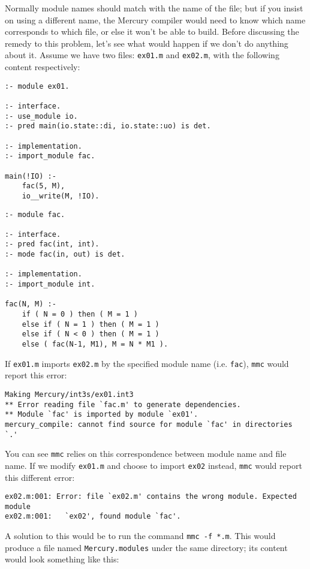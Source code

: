 Normally module names should match with the name of the file; but if you insist on using a different name, the Mercury compiler would need to know which name corresponds to which file, or else it won't be able to build. Before discussing the remedy to this problem, let's see what would happen if we don't do anything about it. Assume we have two files: \texttt{ex01.m} and \texttt{ex02.m}, with the following content respectively:

\begin{lstlisting}[language=Mercury]
% ex01.m
:- module ex01.

:- interface.
:- use_module io.
:- pred main(io.state::di, io.state::uo) is det.

:- implementation.
:- import_module fac.

main(!IO) :-
	fac(5, M),
	io__write(M, !IO).
\end{lstlisting}

\begin{lstlisting}[language=Mercury]
:- module fac.

:- interface.
:- pred fac(int, int).
:- mode fac(in, out) is det.

:- implementation.
:- import_module int.

fac(N, M) :-
	if ( N = 0 ) then ( M = 1 )
	else if ( N = 1 ) then ( M = 1 )
	else if ( N < 0 ) then ( M = 1 )
	else ( fac(N-1, M1), M = N * M1 ).
\end{lstlisting}

If \texttt{ex01.m} imports \texttt{ex02.m} by the specified module name (i.e. \texttt{fac}), \texttt{mmc} would report this error:

\begin{lstlisting}
Making Mercury/int3s/ex01.int3
** Error reading file `fac.m' to generate dependencies.
** Module `fac' is imported by module `ex01'.
mercury_compile: cannot find source for module `fac' in directories `.'
\end{lstlisting}

You can see \texttt{mmc} relies on this correspondence between module name and file name. If we modify \texttt{ex01.m} and choose to import \texttt{ex02} instead, \texttt{mmc} would report this different error:

\begin{lstlisting}
ex02.m:001: Error: file `ex02.m' contains the wrong module. Expected module
ex02.m:001:   `ex02', found module `fac'.
\end{lstlisting}

A solution to this would be to run the command \texttt{mmc -f *.m}. This would produce a file named \texttt{Mercury.modules} under the same directory; its content would look something like this:

